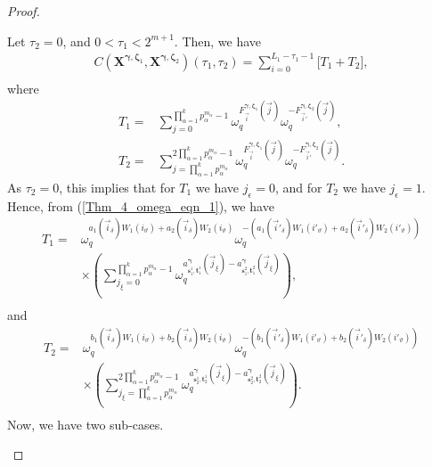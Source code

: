 \documentclass[pdflatex,sn-mathphys-num]{sn-jnl}%
\theoremstyle{thmstyleone}
\begin{document}
\begin{proof}
\begin{mycases}
			\item  Let $\tau_2=0$, and $0 < \tau_1 < 2^{m+1}$. Then, we have
			\begin{equation}\label{eqn_T_sum}
				\begin{split}
					C\left( \mathbf{X}^{\bm{\gamma},\bm{\zeta}_1}, \mathbf{X}^{\bm{\gamma}, \bm{\zeta}_2} \right) (\tau_1, \tau_2) =  \sum_{i=0}^{L_1 -\tau_1-1} \bigg[ T_1 + T_2 \bigg],\\
				\end{split}
			\end{equation}
			where
			\begin{equation}
				\begin{split}
					T_1= & \sum_{j=0}^{\prod_{\alpha=1}^{k} p_\alpha^{m_\alpha} -1} \omega_q^{ 	F_{ \vec{i}}^{\bm{\gamma}, \bm{\zeta}_1} (\vec{j}) } \omega_q^{ 	-F_{ \vec{i}'}^{\bm{\gamma}, \bm{\zeta}_2} (\vec{j}) },\\
					T_2= & \sum_{j= \prod_{\alpha=1}^{k} p_\alpha^{m_\alpha}}^{2 \prod_{\alpha=1}^{k} p_\alpha^{m_\alpha} -1} \omega_q^{ 	F_{ \vec{i}}^{\bm{\gamma}, \bm{\zeta}_1} (\vec{j}) } \omega_q^{ 	-F_{ \vec{i}'}^{\bm{\gamma}, \bm{\zeta}_2} (\vec{j}) }.
				\end{split}
			\end{equation}
			As $\tau_2=0$, this implies that for $T_1$ we have $j_{\epsilon}=0$, and for $T_2$ we have $j_{\epsilon}=1$.
			Hence, from (\ref{Thm_4_omega_eqn_1}), we have
			\begin{equation}\label{eqn_W1W2_1}
				\begin{split}
					T_1= &\omega_q^{a_1(\vec{i}_{\delta}) W_1(i_\vartheta) + a_2(\vec{i}_{\delta}) W_2(i_\vartheta)} \omega_q^{- \left( a_1(\vec{i}'_{\delta}) W_1(i'_\vartheta) + a_2(\vec{i}'_{\delta}) W_2(i'_\vartheta) \right)}\\
					& \times \left( \sum_{j_{\xi}=0}^{\prod_{\alpha=1}^{k} p_\alpha^{m_\alpha} -1} \omega_q^{a_{\mathbf{s}_1^1,\mathbf{t}_1^1}^{\bm{\gamma}} (\vec{j}_{\xi})-a_{\mathbf{s}_1^2,\mathbf{t}_1^2}^{\bm{\gamma}} (\vec{j}_{\xi}) } \right),\\
				\end{split}
			\end{equation}
			and
			\begin{equation}\label{eqn_W1W2_2}
				\begin{split}
					T_2=& \omega_q^{b_1(\vec{i}_{\delta}) W_1(i_\vartheta) + b_2(\vec{i}_{\delta}) W_2(i_\vartheta)}  \omega_q^{- \left( b_1(\vec{i}'_{\delta}) W_1(i'_\vartheta) + b_2(\vec{i}'_{\delta}) W_2(i'_\vartheta) \right)}\\
					& \times \left( \sum_{j_{\xi}= \prod_{\alpha=1}^{k} p_\alpha^{m_\alpha}}^{2 \prod_{\alpha=1}^{k} p_\alpha^{m_\alpha} -1} \omega_q^{a_{\mathbf{s}_2^1,\mathbf{t}_2^1}^{\bm{\gamma}} (\vec{j}_{\xi})-a_{\mathbf{s}_2^2,\mathbf{t}_2^2}^{\bm{\gamma}} (\vec{j}_{\xi}) } \right).\\
				\end{split}
			\end{equation}
			Now, we have two sub-cases.
			

\end{mycases}
\end{proof}
\end{document}
